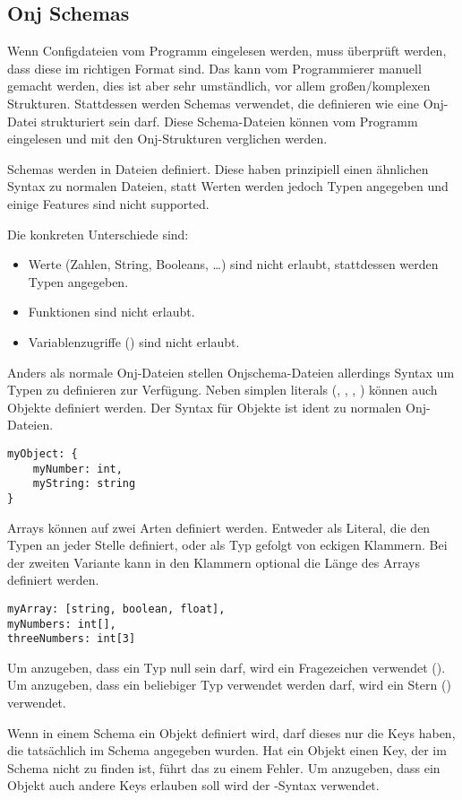 
\subsection{Onj Schemas}\label{subsec:onj-schemas}

\renewcommand{\kapitelautor}{Autor: Marvin Kurka}

Wenn Configdateien vom Programm eingelesen werden, muss überprüft werden, dass diese im richtigen Format sind.
Das kann vom Programmierer manuell gemacht werden, dies ist aber sehr umständlich, vor allem großen/komplexen Strukturen.
Stattdessen werden Schemas verwendet, die definieren wie eine Onj-Datei strukturiert sein darf.
Diese Schema-Dateien können vom Programm eingelesen und mit den Onj-Strukturen verglichen werden.

Schemas werden in  Dateien definiert.
Diese haben prinzipiell einen ähnlichen Syntax zu normalen  Dateien, statt Werten werden jedoch
Typen angegeben und einige Features sind nicht supported.

Die konkreten Unterschiede sind:
\begin{itemize}
    \item Werte (\zB Zahlen, String, Booleans, \ldots) sind nicht erlaubt, stattdessen werden Typen angegeben.
    \item Funktionen sind nicht erlaubt.
    \item Variablenzugriffe () sind nicht erlaubt.
\end{itemize}

Anders als normale Onj-Dateien stellen Onjschema-Dateien allerdings Syntax um Typen zu definieren zur Verfügung.
Neben simplen literals (, , , ) können auch
Objekte definiert werden.
Der Syntax für Objekte ist ident zu normalen Onj-Dateien.

\begin{verbatim}
myObject: {
    myNumber: int,
    myString: string
}
\end{verbatim}

Arrays können auf zwei Arten definiert werden.
Entweder als Literal, die den Typen an jeder Stelle definiert, oder als Typ gefolgt von eckigen Klammern.
Bei der zweiten Variante kann in den Klammern optional die Länge des Arrays definiert werden.

\begin{verbatim}
myArray: [string, boolean, float],
myNumbers: int[],
threeNumbers: int[3]
\end{verbatim}

Um anzugeben, dass ein Typ null sein darf, wird ein Fragezeichen verwendet ().
Um anzugeben, dass ein beliebiger Typ verwendet werden darf, wird ein Stern (\inlineOnj{*}) verwendet.

Wenn in einem Schema ein Objekt definiert wird, darf dieses nur die Keys haben, die tatsächlich im Schema angegeben
wurden.
Hat ein Objekt einen Key, der im Schema nicht zu finden ist, führt das zu einem Fehler.
Um anzugeben, dass ein Objekt auch andere Keys erlauben soll wird der -Syntax verwendet.

\renewcommand{\kapitelautor}{}
